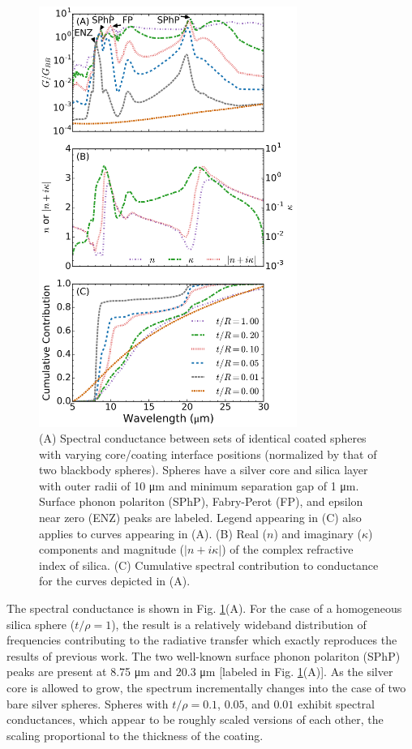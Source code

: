 \begin{figure}
\centering
\includegraphics[width=0.75\textwidth]{./Figures/figure2.png}
\caption{\label{fig:SpectralConductance} (A) Spectral conductance between sets of identical coated spheres with varying core/coating interface positions (normalized by that of two blackbody spheres). Spheres have a silver core and silica layer with outer radii of 10 \si{\micro\meter} and minimum separation gap of 1 \si{\micro\meter}. Surface phonon polariton (SPhP), Fabry-Perot (FP), and epsilon near zero (ENZ) peaks are labeled. Legend appearing in (C) also applies to curves appearing in (A). (B) Real ($n$) and imaginary ($\kappa$) components and magnitude ($|n+i\kappa|$) of the complex refractive index of silica. (C) Cumulative spectral contribution to conductance for the curves depicted in (A).}
\end{figure}

The spectral conductance is shown in Fig. \ref{fig:SpectralConductance}(A). For the case of a homogeneous silica sphere ($t/\rho=1$), the result is a relatively wideband distribution of frequencies contributing to the radiative transfer which exactly reproduces the results of previous work. \cite{Narayanaswamy2008} The two well-known surface phonon polariton (SPhP) peaks are present at 8.75 \si{\micro\meter} and 20.3 \si{\micro\meter} [labeled in Fig. \ref{fig:SpectralConductance}(A)]. As the silver core is allowed to grow, the spectrum incrementally changes into the case of two bare silver spheres. Spheres with $t/\rho=0.1$, $0.05$, and $0.01$ exhibit spectral conductances, which appear to be roughly scaled versions of each other, the scaling proportional to the thickness of the coating. 

